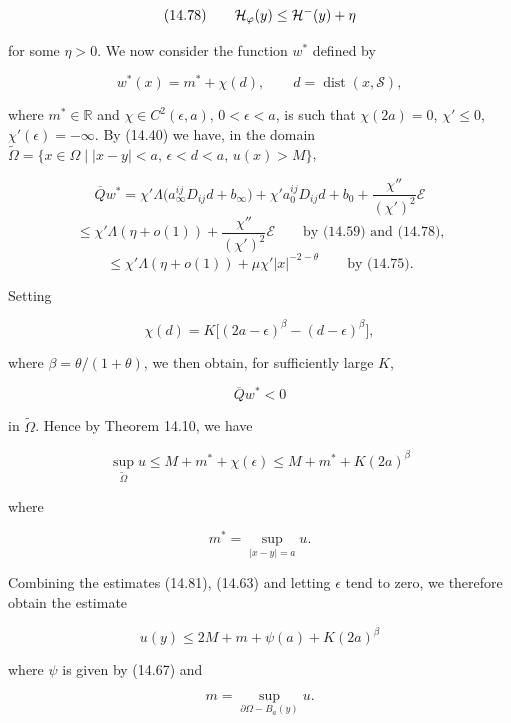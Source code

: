 \[
(14.78)\qquad \mathcal{H}_{\varphi}(y)\le \mathcal{H}^{-}(y)+\eta
\]



for some $\eta > 0$. We now consider the function $w^*$ defined by

\begin{equation}
w^*(x)=m^*+\chi(d), \qquad d=\operatorname{dist}(x,\mathcal{S}),
\tag{14.79}
\end{equation}

where $m^* \in \mathbb{R}$ and $\chi \in C^2(\epsilon,a),\, 0 < \epsilon < a$, is such that $\chi(2a)=0$, $\chi' \leq 0$, $\chi'(\epsilon)=-\infty$. By (14.40) we have, in the domain $\tilde{\Omega}=\{x \in \Omega \mid |x-y|<a,\, \epsilon<d<a,\, u(x)>M\}$,

\[
\overline{Q}w^*=\chi' \Lambda\!\bigl(a_{\infty}^{ij} D_{ij} d + b_{\infty}\bigr)+\chi' a_0^{ij} D_{ij} d + b_0 + \frac{\chi''}{(\chi')^2}\mathcal{E}
\]
\[
\leq \chi'\Lambda(\eta+o(1))+\frac{\chi''}{(\chi')^2}\mathcal{E}\qquad \text{by (14.59) and (14.78),}
\]
\[
\leq \chi'\Lambda(\eta+o(1))+\mu\chi'|x|^{-2-\theta}\qquad \text{by (14.75).}
\]

Setting

\begin{equation}
\chi(d)=K\bigl[(2a-\epsilon)^\beta-(d-\epsilon)^\beta\bigr],
\tag{14.80}
\end{equation}

where $\beta=\theta/(1+\theta)$, we then obtain, for sufficiently large $K$,

\[
\overline{Q}w^*<0
\]

in $\tilde{\Omega}$. Hence by Theorem 14.10, we have

\begin{equation}
\sup_{\tilde{\Omega}} u \leq M+m^*+\chi(\epsilon)
\leq M+m^*+K(2a)^\beta
\tag{14.81}
\end{equation}

where

\[
m^*=\sup_{|x-y|=a} u.
\]

Combining the estimates (14.81), (14.63) and letting $\epsilon$ tend to zero, we therefore obtain the estimate

\begin{equation}
u(y)\leq 2M+m+\psi(a)+K(2a)^\beta
\tag{14.82}
\end{equation}

where $\psi$ is given by (14.67) and

\[
m=\sup_{\partial\Omega-B_a(y)} u.
\]

